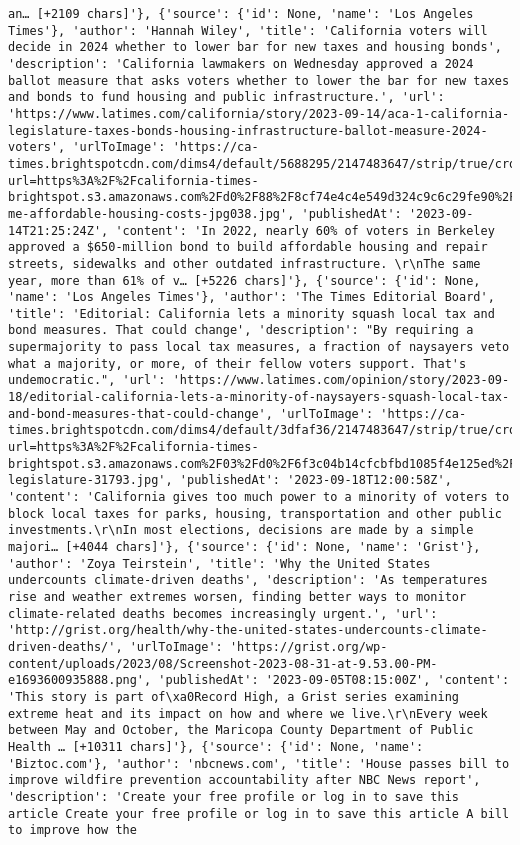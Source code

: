 \documentclass[
  letterpaper,
  DIV=11,
  numbers=noendperiod]{scrartcl}
\begin{document}
\begin{verbatim}
an… [+2109 chars]'}, {'source': {'id': None, 'name': 'Los Angeles Times'}, 'author': 'Hannah Wiley', 'title': 'California voters will decide in 2024 whether to lower bar for new taxes and housing bonds', 'description': 'California lawmakers on Wednesday approved a 2024 ballot measure that asks voters whether to lower the bar for new taxes and bonds to fund housing and public infrastructure.', 'url': 'https://www.latimes.com/california/story/2023-09-14/aca-1-california-legislature-taxes-bonds-housing-infrastructure-ballot-measure-2024-voters', 'urlToImage': 'https://ca-times.brightspotcdn.com/dims4/default/5688295/2147483647/strip/true/crop/3992x2096+0+448/resize/1200x630!/quality/75/?url=https%3A%2F%2Fcalifornia-times-brightspot.s3.amazonaws.com%2Fd0%2F88%2F8cf74e4c4e549d324c9c6c29fe90%2F974034-me-affordable-housing-costs-jpg038.jpg', 'publishedAt': '2023-09-14T21:25:24Z', 'content': 'In 2022, nearly 60% of voters in Berkeley approved a $650-million bond to build affordable housing and repair streets, sidewalks and other outdated infrastructure. \r\nThe same year, more than 61% of v… [+5226 chars]'}, {'source': {'id': None, 'name': 'Los Angeles Times'}, 'author': 'The Times Editorial Board', 'title': 'Editorial: California lets a minority squash local tax and bond measures. That could change', 'description': "By requiring a supermajority to pass local tax measures, a fraction of naysayers veto what a majority, or more, of their fellow voters support. That's undemocratic.", 'url': 'https://www.latimes.com/opinion/story/2023-09-18/editorial-california-lets-a-minority-of-naysayers-squash-local-tax-and-bond-measures-that-could-change', 'urlToImage': 'https://ca-times.brightspotcdn.com/dims4/default/3dfaf36/2147483647/strip/true/crop/5188x2724+0+445/resize/1200x630!/quality/75/?url=https%3A%2F%2Fcalifornia-times-brightspot.s3.amazonaws.com%2F03%2Fd0%2F6f3c04b14cfcbfbd1085f4e125ed%2Fcalifornia-legislature-31793.jpg', 'publishedAt': '2023-09-18T12:00:58Z', 'content': 'California gives too much power to a minority of voters to block local taxes for parks, housing, transportation and other public investments.\r\nIn most elections, decisions are made by a simple majori… [+4044 chars]'}, {'source': {'id': None, 'name': 'Grist'}, 'author': 'Zoya Teirstein', 'title': 'Why the United States undercounts climate-driven deaths', 'description': 'As temperatures rise and weather extremes worsen, finding better ways to monitor climate-related deaths becomes increasingly urgent.', 'url': 'http://grist.org/health/why-the-united-states-undercounts-climate-driven-deaths/', 'urlToImage': 'https://grist.org/wp-content/uploads/2023/08/Screenshot-2023-08-31-at-9.53.00-PM-e1693600935888.png', 'publishedAt': '2023-09-05T08:15:00Z', 'content': 'This story is part of\xa0Record High, a Grist series examining extreme heat and its impact on how and where we live.\r\nEvery week between May and October, the Maricopa County Department of Public Health … [+10311 chars]'}, {'source': {'id': None, 'name': 'Biztoc.com'}, 'author': 'nbcnews.com', 'title': 'House passes bill to improve wildfire prevention accountability after NBC News report', 'description': 'Create your free profile or log in to save this article Create your free profile or log in to save this article A bill to improve how the 
\end{verbatim}
\end{document}
